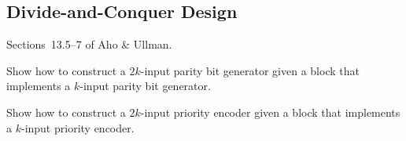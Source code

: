 \subsection{Divide-and-Conquer Design}
 Sections~13.5--7 of Aho \& Ullman.
\begin{exercises}
\item Show how to construct a $2k$-input parity bit generator given a block that implements a $k$-input parity bit generator.

\item Show how to construct a $2k$-input priority encoder given a block that implements a $k$-input priority encoder.
\end{exercises}


